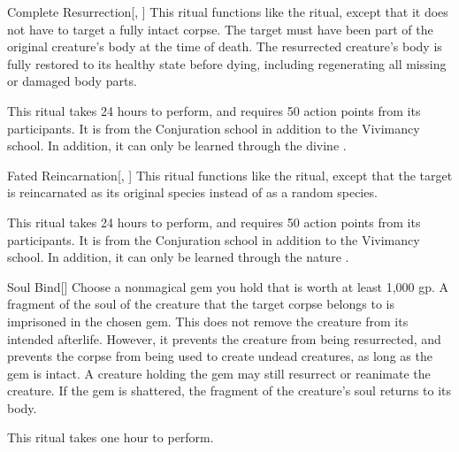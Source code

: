 \lowercase{\hypertarget{spell:Complete Resurrection}{}}\label{spell:Complete Resurrection}
\begin{apability}[\nth{5}]{\hypertarget{spell:Complete Resurrection}{Complete Resurrection}}[, ]
This ritual functions like the  ritual, except that it does not have to target a fully intact corpse.
The target must have been part of the original creature's body at the time of death.
The resurrected creature's body is fully restored to its healthy state before dying, including regenerating all missing or damaged body parts.

This ritual takes 24 hours to perform, and requires 50 action points from its participants.
It is from the Conjuration school in addition to the Vivimancy school.
In addition, it can only be learned through the divine .
\end{apability}
\vspace{0.25em}



\lowercase{\hypertarget{spell:Fated Reincarnation}{}}\label{spell:Fated Reincarnation}
\begin{apability}[\nth{5}]{\hypertarget{spell:Fated Reincarnation}{Fated Reincarnation}}[, ]
This ritual functions like the  ritual, except that the target is reincarnated as its original species instead of as a random species.

This ritual takes 24 hours to perform, and requires 50 action points from its participants.
It is from the Conjuration school in addition to the Vivimancy school.
In addition, it can only be learned through the nature .
\end{apability}
\vspace{0.25em}



\lowercase{\hypertarget{spell:Soul Bind}{}}\label{spell:Soul Bind}
\begin{apability}[\nth{5}]{\hypertarget{spell:Soul Bind}{Soul Bind}}[]
Choose a nonmagical gem you hold that is worth at least 1,000 gp.
A fragment of the soul of the creature that the target corpse belongs to is imprisoned in the chosen gem.
This does not remove the creature from its intended afterlife.
However, it prevents the creature from being resurrected, and prevents the corpse from being used to create undead creatures, as long as the gem is intact.
A creature holding the gem may still resurrect or reanimate the creature.
If the gem is shattered, the fragment of the creature's soul returns to its body.

This ritual takes one hour to perform.
\end{apability}
\vspace{0.25em}



